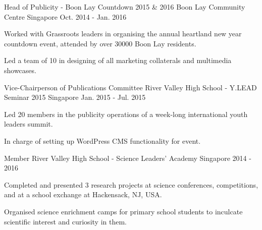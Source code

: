 \begin{cventries}
  \cventry
    {Head of Publicity - Boon Lay Countdown 2015 \& 2016} %
    {Boon Lay Community Centre} %
    {Singapore} %
    {Oct. 2014 - Jan. 2016} %
    {
      \begin{cvitems} %
        \item {Worked with Grassroots leaders in organising the annual heartland new year countdown event, attended by over 30000 Boon Lay residents.}
        \item {Led a team of 10 in designing of all marketing collaterals and multimedia showcases.}
      \end{cvitems}
    }

  \cventry
    {Vice-Chairperson of Publications Committee} %
    {River Valley High School - Y.LEAD Seminar 2015} %
    {Singapore} %
    {Jan. 2015 - Jul. 2015} %
    {
      \begin{cvitems} %
        \item {Led 20 members in the publicity operations of a week-long international youth leaders summit.}
        \item {In charge of setting up WordPress CMS functionality for event.}
      \end{cvitems}
    }

  \cventry
    {Member} %
    {River Valley High School - Science Leaders' Academy} %
    {Singapore} %
    {2014 - 2016} %
    {
      \begin{cvitems} %
        \item {Completed and presented 3 research projects at science conferences, competitions, and at a school exchange at Hackensack, NJ, USA.}
        \item {Organised science enrichment camps for primary school students to inculcate scientific interest and curiosity in them.}
      \end{cvitems}
    }

\end{cventries}
